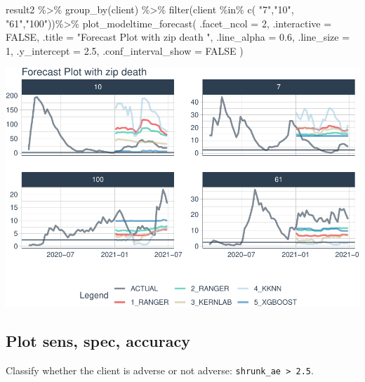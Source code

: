 \documentclass[
]{article}
\newenvironment{Shaded}{\begin{snugshade}}{\end{snugshade}}
\newcommand{\AttributeTok}[1]{\textcolor[rgb]{0.77,0.63,0.00}{#1}}
\newcommand{\ConstantTok}[1]{\textcolor[rgb]{0.00,0.00,0.00}{#1}}
\newcommand{\DecValTok}[1]{\textcolor[rgb]{0.00,0.00,0.81}{#1}}
\newcommand{\FloatTok}[1]{\textcolor[rgb]{0.00,0.00,0.81}{#1}}
\newcommand{\FunctionTok}[1]{\textcolor[rgb]{0.00,0.00,0.00}{#1}}
\newcommand{\NormalTok}[1]{#1}
\newcommand{\SpecialCharTok}[1]{\textcolor[rgb]{0.00,0.00,0.00}{#1}}
\newcommand{\StringTok}[1]{\textcolor[rgb]{0.31,0.60,0.02}{#1}}
\begin{document}
\begin{Shaded}
\begin{Highlighting}[]
\NormalTok{result2 }\SpecialCharTok{\%\textgreater{}\%}
    \FunctionTok{group\_by}\NormalTok{(client) }\SpecialCharTok{\%\textgreater{}\%}
    \FunctionTok{filter}\NormalTok{(client }\SpecialCharTok{\%in\%} \FunctionTok{c}\NormalTok{(  }\StringTok{"7"}\NormalTok{,}\StringTok{"10"}\NormalTok{, }\StringTok{"61"}\NormalTok{,}\StringTok{"100"}\NormalTok{))}\SpecialCharTok{\%\textgreater{}\%}
    \FunctionTok{plot\_modeltime\_forecast}\NormalTok{(}
        \AttributeTok{.facet\_ncol  =} \DecValTok{2}\NormalTok{,}
        \AttributeTok{.interactive =} \ConstantTok{FALSE}\NormalTok{,}
        \AttributeTok{.title =} \StringTok{"Forecast Plot with zip death "}\NormalTok{,}
        \AttributeTok{.line\_alpha =} \FloatTok{0.6}\NormalTok{,}
        \AttributeTok{.line\_size =} \DecValTok{1}\NormalTok{,}
        \AttributeTok{.y\_intercept =} \FloatTok{2.5}\NormalTok{,}
        \AttributeTok{.conf\_interval\_show =} \ConstantTok{FALSE}
\NormalTok{    )}
\end{Highlighting}
\end{Shaded}

\includegraphics{figures/report/fig-unnamed-chunk-80-3.pdf}

\hypertarget{plot-sens-spec-accuracy}{%
\subsection{Plot sens, spec, accuracy}\label{plot-sens-spec-accuracy}}

Classify whether the client is adverse or not adverse:
\texttt{shrunk\_ae\ \textgreater{}\ 2.5}.
\end{document}
